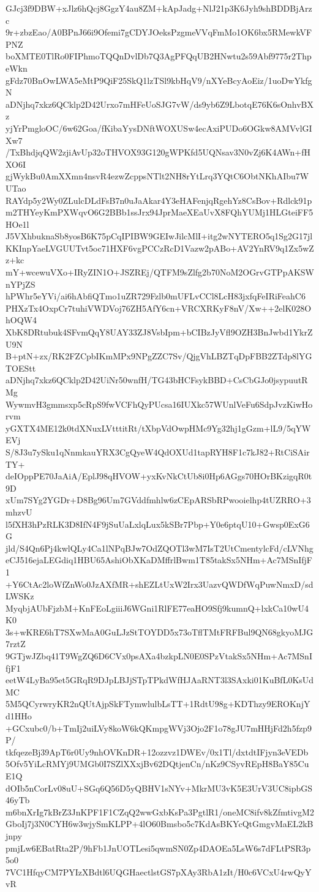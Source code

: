 GJcj3f9DBW+xJlz6hQcj8GgzY4au8ZM+kApJadg+NlJ21p3K6Jyh9shBDDBjArzc
9r+zbzEao/A0BPnJ66i9Ofemi7gCDYJOeksPzgmeVVqFmMo1OK6bx5RMewkVFPNZ
boXMTE0TlRo0FIPhmoTQQnDvlDb7Q3AgPFQqUB2HNwtu2s59Abf9775r2ThpeWkn
gFdz70BnOwLWA5eMtP9QiF25SkQ1lzTSl9kbHqV9/nXYeBcyAoEiz/1uoDwYkfgN
aDNjhq7xkz6QCklp2D42Urxo7mHFeUoSJG7vW/ds9yb6Z9LbotqE76K6sOnhvBXz
yjYrPmgloOC/6w62Goa/fKibaYysDNftWOXUSw4ecAxiPUDo6OGkw8AMVvlGIXw7
/TxBhdjqQW2zjiAvUp32oTHVOX93G120gWPKfd5UQNsav3N0vZj6K4AWn+fHXO6I
gjWykBu0AmXXmn4nsvR4ezwZcppsNTlt2NH8rYtLrq3YQtC6ObtNKhAIbu7WUTao
RAYdp5y2Wy0ZLulcDLdFsB7n0uJaAkar4Y3eHAFenjqRgehYz8CsBov+Rdlck91p
m2THYeyKmPXWqvO6G2BBb1ssJrx94JprMaeXEaUvX8FQhYUMj1HLGteiFF5HOe1l
J5VXhbuknaSb8yosB6K75pCqIPIBW9GEIwJilcMlI+itg2wNYTERO5q1Sg2G17jl
KKInpYaeLVGUUTvt5oc71HXF6vgPCCzRcD1Vazw2pABo+AV2YnRV9q1Zx5wZz+kc
mY+wcewuVXo+IRyZIN1O+JSZREj/QTFM9sZlfg2b70NoM2OGrvGTPpAKSWnYPjZS
hPWhr5eYVi/ai6hAbfiQTmo1uZR729Fzlb0mUFLvCCl8LcH83jxfqFeIRiFeahC6
PHXzTx4OxpCr7tuhiVWDVoj76ZH5AfY6cn+VRCXRKyF8nV/Xw++2elK028OhOQW4
XbK8DRtubuk4SFvmQqY8UAY33ZJ8VsbIpm+bCIBzJyVfl9OZH3BnJwbd1YkrZU9N
B+ptN+zx/RK2FZCpbIKmMPx9NPgZZC7Sv/QjgVhLBZTqDpFBB2ZTdp8lYGTOEStt
aDNjhq7xkz6QCklp2D42UiNr50wnfH/TG43bHCFsykBBD+CsCbGJo0jsypuutRMg
WywmvH3gmmsxp5cRpS9fwVCFhQyPUcsa16IUXkc57WUnlVeFu6SdpJvzKiwHorvm
yGXTX4ME12k0tdXNuxLVtttitRt/tXbpVdOwpHMc9Yg32hj1gGzm+lL9/5qYWEVj
S/8J3u7ySku1qNnmkauYRX3CgQyeW4QdOXUd1tapRYH8F1c7kJ82+RtCiSAirTY+
deIOppPE70JaAiA/EplJ98qHVOW+yxKvNkCtUb8i0Hp6AGgs70HOrBKzigqR0t9D
xUm7SYg2YGDr+D8Bg96Um7GVddfmhlw6zCEpARSbRPwooielhp4tUZRRO+3mhzvU
l5fXH3hPzRLK3D8IfN4F9jSuUaLxlqLux5kSBr7Pbp+Y0e6ptqU10+Gwsp0ExG6G
jld/S4Qn6Pj4kwlQLy4Ca1lNPqBJw7OdZQOTl3wM7IsT2UtCmentylcFd/cLVNhg
eCJ516ejaLEGdiq1HBU65AshiObXKaDMffrlBwm1T85takSx5NHm+Ac7MSnIfjF1
+Y6CtAc2loWfZnWo0JzAXfMR+shEZLtUxW2Irx3UazvQWDfWqPuwNmxD/sdLWSKz
MyqbjAUbFjzbM+KnFEoLgiiiJ6WGni1RlFE77eaHO9Sfj9kumnQ+lxkCa10wU4K0
3s+wKRE6hT7SXwMaA0GuLJzStTOYDD5x73oTflTMtFRFBul9QN68gkyoMJG7rztZ
9GTjwJZbq41T9WgZQ6D6CVx0psAXa4bzkpLN0E0SPzVtakSx5NHm+Ac7MSnIfjF1
eetW4LyBa95et5GRqR9DJpLBJjSTpTPkdWfHJAaRNT3l3SAxki01KuBfL0KsUdMC
5M5QCyrwryKR2nQUtAjpSkFTymwlulbLsTT+1RdtU98g+KDThzy9EROKnjYd1HHo
+GCxubc0/b+TmIj2uiLVy8koW6kQKmpgWVj3Ojo2F1o78gJU7mHHjFd2h5fzp9P/
tkfqezeBj39ApT6r0Uy9nhOVKnDR+12ozzvz1DWEv/0x1Tl/dxtdtIFjyn3eVEDb
5Ofv5YiLcRMYj9UMGb0I7SZlXXxjBv62DQtjenCn/nKz9CSyvREpH8BaY85CuE1Q
dOIb5nCorLv08uU+SGq6Q56D5yQBHV1sNYv+MkrMU3vK5E3UrV3UC8ipbGS46yTb
m6bnXrIg7kBrZ3JnKPF1F1CZqQ2wwGxbKsPa3PgtlR1/oneMC8ifv8kZfmtivgM2
GboIj7j3N0CYH6w3wjySmKLPP+4lO60Bmsbo5c7KdAsBKYcQtGmgvMaEL2kBjnpy
pmjLw6EBatRta2P/9hFb1JnUOTLesi5qwmSN0Zp4DAOEa5LsW6s7dFLtPSR3p5o0
7VC1HfqyCM7PYIzXBdtl6UQGHaectlstGS7pXAy3RbA1zIt/H0c6VCxU4rwQyYvR
